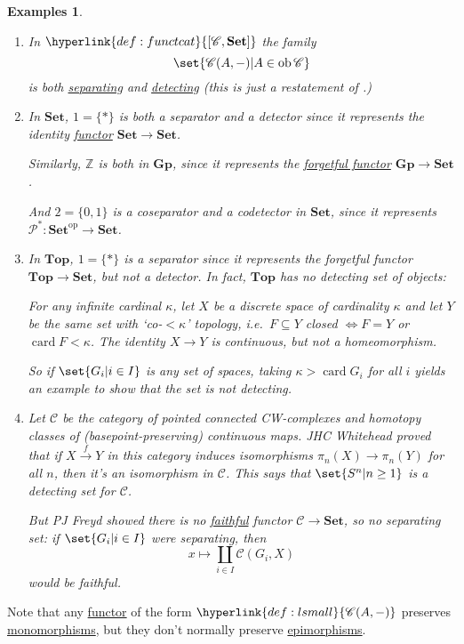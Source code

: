 \documentclass{article}
\DeclareMathOperator{\ob}{ob}
\newtheorem{nexample}[nthm]{Examples}
\begin{document}
\begin{nexample}\label{eg:2.10}\leavevmode
  \begin{enumerate}[label=(\alph*)]
    \item In $\hyperlink{def:functcat}{[\mathscr{C}, \mathbf{Set}]}$ the family
      \begin{equation*}
        \set{\mathscr{C}(A, -) | A \in \ob \mathscr{C}}
      \end{equation*}
      is both \hyperlink{def:separating}{separating} and \hyperlink{def:detecting}{detecting} (this is just a restatement of .)
    \item In $\mathbf{Set}$, $1 = \{*\}$ is both a separator and a detector since it represents the identity \hyperlink{def:funct}{functor} $\mathbf{Set} \to \mathbf{Set}$.

      Similarly, $\mathbb{Z}$ is both in $\mathbf{Gp}$, since it represents the \hyperlink{def:forgFunc}{forgetful functor} $\mathbf{Gp} \to \mathbf{Set}$.

      And $2 = \{0,1\}$ is a coseparator and a codetector in $\mathbf{Set}$, since it represents $\mathcal{P}^*: \mathbf{Set}^\text{op} \to \mathbf{Set}$.
    \item In $\mathbf{Top}$, $1 = \{*\}$ is a separator since it represents the forgetful functor $\mathbf{Top} \to \mathbf{Set}$, but not a detector.
      In fact, $\mathbf{Top}$ has no detecting \emph{set} of objects:

      For any infinite cardinal $\kappa$, let $X$ be a discrete space of cardinality $\kappa$ and let $Y$ be the same set with `co-$< \kappa$' topology, i.e.\ $F \subseteq Y$ closed $\iff F = Y$ or $\operatorname{card} F < \kappa$.
      The identity $X \to Y$ is continuous, but not a homeomorphism.

      So if $\set{G_i | i \in I}$ is any set of spaces, taking $\kappa > \operatorname{card} G_i$ for all $i$ yields an example to show that the set is not detecting.
    \item Let $\mathscr{C}$ be the category of pointed connected CW-complexes and homotopy classes of (basepoint-preserving) continuous maps.
      JHC Whitehead proved that if $X \xrightarrow{f} Y$ in this category induces isomorphisms $\pi_n(X) \to \pi_n(Y)$ for all $n$, then it's an isomorphism in $\mathscr{C}$.
      This says that $\set{S^n | n \geq 1}$ is a detecting set for $\mathscr{C}$.

      But PJ Freyd showed there is no \hyperlink{def:full}{faithful} functor $\mathscr{C} \to \mathbf{Set}$, so no separating \emph{set}: if $\set{G_i | i \in I}$ were separating, then
      \begin{equation*}
        x \mapsto \coprod_{i \in I} \mathscr{C}(G_i, X)
      \end{equation*}
      would be faithful.
  \end{enumerate}
\end{nexample}
Note that any \hyperlink{def:funct}{functor} of the form $\hyperlink{def:lsmall}{\mathscr{C}(A, -)}$ preserves \hyperlink{def:monic}{monomorphisms}, but they don't normally preserve \hyperlink{def:epic}{epimorphisms}.
\end{document}
